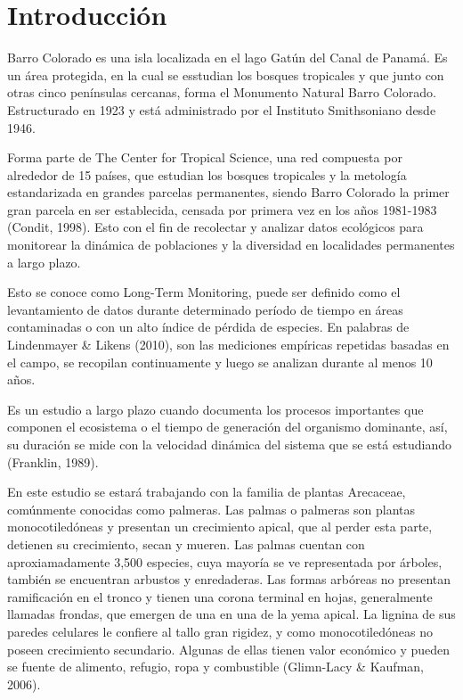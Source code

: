 \documentclass[11pt,]{article}
\begin{document}
\vskip 6.5pt


\noindent  \section{Introducción}\label{introducciuxf3n}

Barro Colorado es una isla localizada en el lago Gatún del Canal de
Panamá. Es un área protegida, en la cual se esstudian los bosques
tropicales y que junto con otras cinco penínsulas cercanas, forma el
Monumento Natural Barro Colorado. Estructurado en 1923 y está
administrado por el Instituto Smithsoniano desde 1946.

Forma parte de The Center for Tropical Science, una red compuesta por
alrededor de 15 países, que estudian los bosques tropicales y la
metología estandarizada en grandes parcelas permanentes, siendo Barro
Colorado la primer gran parcela en ser establecida, censada por primera
vez en los años 1981-1983 (Condit, 1998). Esto con el fin de recolectar
y analizar datos ecológicos para monitorear la dinámica de poblaciones y
la diversidad en localidades permanentes a largo plazo.

Esto se conoce como Long-Term Monitoring, puede ser definido como el
levantamiento de datos durante determinado período de tiempo en áreas
contaminadas o con un alto índice de pérdida de especies. En palabras de
Lindenmayer \& Likens (2010), son las mediciones empíricas repetidas
basadas en el campo, se recopilan continuamente y luego se analizan
durante al menos 10 años.

Es un estudio a largo plazo cuando documenta los procesos importantes
que componen el ecosistema o el tiempo de generación del organismo
dominante, así, su duración se mide con la velocidad dinámica del
sistema que se está estudiando (Franklin, 1989).

En este estudio se estará trabajando con la familia de plantas
Arecaceae, comúnmente conocidas como palmeras. Las palmas o palmeras son
plantas monocotiledóneas y presentan un crecimiento apical, que al
perder esta parte, detienen su crecimiento, secan y mueren. Las palmas
cuentan con aproxiamadamente 3,500 especies, cuya mayoría se ve
representada por árboles, también se encuentran arbustos y enredaderas.
Las formas arbóreas no presentan ramificación en el tronco y tienen una
corona terminal en hojas, generalmente llamadas frondas, que emergen de
una en una de la yema apical. La lignina de sus paredes celulares le
confiere al tallo gran rigidez, y como monocotiledóneas no poseen
crecimiento secundario. Algunas de ellas tienen valor económico y pueden
se fuente de alimento, refugio, ropa y combustible (Glimn-Lacy \&
Kaufman, 2006).
\end{document}
